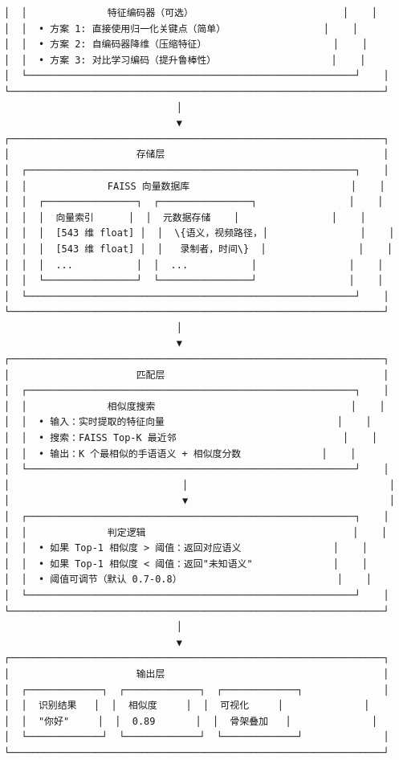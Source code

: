 \documentclass[a4paper,12pt]{article}
\begin{document}
\begin{verbatim}
│  │              特征编码器（可选）                          │    │
│  │  • 方案 1: 直接使用归一化关键点（简单）                 │    │
│  │  • 方案 2: 自编码器降维（压缩特征）                      │    │
│  │  • 方案 3: 对比学习编码（提升鲁棒性）                    │    │
│  └─────────────────────────────────────────────────────────┘    │
└─────────────────────────────────────────────────────────────────┘
                              │
                              ▼
┌─────────────────────────────────────────────────────────────────┐
│                      存储层                                      │
│  ┌─────────────────────────────────────────────────────────┐    │
│  │              FAISS 向量数据库                            │    │
│  │  ┌────────────────┐  ┌────────────────┐                │    │
│  │  │  向量索引      │  │  元数据存储    │                │    │
│  │  │  [543 维 float] │  │  \{语义，视频路径，│                │    │
│  │  │  [543 维 float] │  │   录制者，时间\}  │                │    │
│  │  │  ...           │  │  ...           │                │    │
│  │  └────────────────┘  └────────────────┘                │    │
│  └─────────────────────────────────────────────────────────┘    │
└─────────────────────────────────────────────────────────────────┘
                              │
                              ▼
┌─────────────────────────────────────────────────────────────────┐
│                      匹配层                                      │
│  ┌─────────────────────────────────────────────────────────┐    │
│  │              相似度搜索                                  │    │
│  │  • 输入：实时提取的特征向量                              │    │
│  │  • 搜索：FAISS Top-K 最近邻                             │    │
│  │  • 输出：K 个最相似的手语语义 + 相似度分数              │    │
│  └─────────────────────────────────────────────────────────┘    │
│                              │                                   │
│                              ▼                                   │
│  ┌─────────────────────────────────────────────────────────┐    │
│  │              判定逻辑                                    │    │
│  │  • 如果 Top-1 相似度 > 阈值：返回对应语义                │    │
│  │  • 如果 Top-1 相似度 < 阈值：返回"未知语义"              │    │
│  │  • 阈值可调节（默认 0.7-0.8）                           │    │
│  └─────────────────────────────────────────────────────────┘    │
└─────────────────────────────────────────────────────────────────┘
                              │
                              ▼
┌─────────────────────────────────────────────────────────────────┐
│                      输出层                                      │
│  ┌─────────────┐  ┌─────────────┐  ┌─────────────┐              │
│  │  识别结果   │  │  相似度     │  │  可视化     │              │
│  │  "你好"     │  │  0.89       │  │  骨架叠加   │              │
│  └─────────────┘  └─────────────┘  └─────────────┘              │
└─────────────────────────────────────────────────────────────────┘
\end{verbatim}
\end{document}
